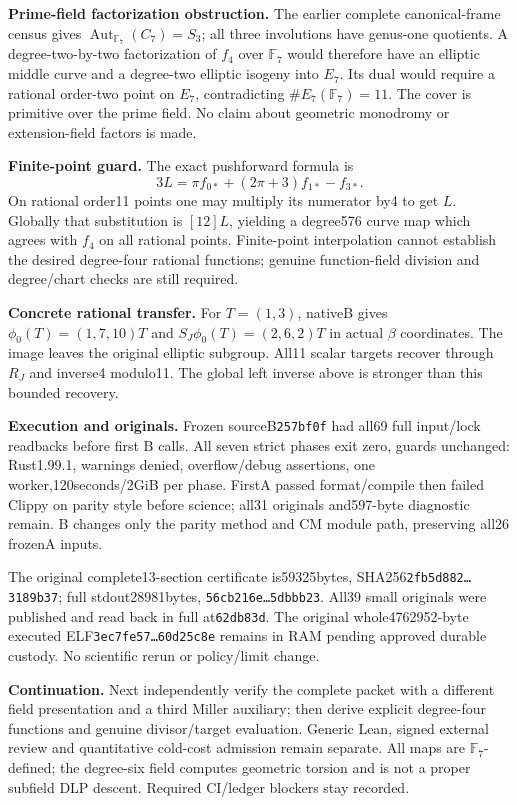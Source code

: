 \documentclass[10pt,a4paper]{article}
\begin{document}
\textbf{Prime-field factorization obstruction.} The earlier complete
canonical-frame census gives $\operatorname{Aut}_{\mathbb F_7}(C_7)=S_3$;
all three involutions have genus-one quotients. A degree-two-by-two
factorization of $f_4$ over $\mathbb F_7$ would therefore have an elliptic
middle curve and a degree-two elliptic isogeny into $E_7$. Its dual
would require a rational order-two point on $E_7$, contradicting
$\#E_7(\mathbb F_7)=11$. The cover is primitive over the prime field.
No claim about geometric monodromy or extension-field factors is made.

\textbf{Finite-point guard.} The exact pushforward formula is
\[
 3L=\pi f_{0*}+(2\pi+3)f_{1*}-f_{3*}.
\]
On rational order11 points one may multiply its numerator by4 to get
$L$. Globally that substitution is $[12]L$, yielding a degree576 curve
map which agrees with $f_4$ on all rational points. Finite-point
interpolation cannot establish the desired degree-four rational
functions; genuine function-field division and degree/chart checks
are still required.

\textbf{Concrete rational transfer.} For $T=(1,3)$, nativeB gives
$\phi_0(T)=(1,7,10)T$ and $S_J\phi_0(T)=(2,6,2)T$ in actual
$\beta$ coordinates. The image leaves the original elliptic subgroup.
All11 scalar targets recover through $R_J$ and inverse4 modulo11.
The global left inverse above is stronger than this bounded recovery.

\textbf{Execution and originals.} Frozen sourceB\texttt{257bf0f}
had all69 full input/lock readbacks before first B calls. All seven
strict phases exit zero, guards unchanged: Rust1.99.1, warnings denied,
overflow/debug assertions, one worker,120seconds/2GiB per phase.
FirstA passed format/compile then failed Clippy on parity style before
science; all31 originals and597-byte diagnostic remain. B changes only
the parity method and CM module path, preserving all26 frozenA inputs.

The original complete13-section certificate is59325bytes,
SHA256\texttt{2fb5d882\ldots{}3189b37}; full stdout28981bytes,
\texttt{56cb216e\ldots{}5dbbb23}. All39 small originals were published
and read back in full at\texttt{62db83d}. The original whole4762952-byte
executed ELF\texttt{3ec7fe57\ldots{}60d25c8e} remains in RAM pending
approved durable custody. No scientific rerun or policy/limit change.

\textbf{Continuation.} Next independently verify the complete packet
with a different field presentation and a third Miller auxiliary;
then derive explicit degree-four functions and genuine divisor/target
evaluation. Generic Lean, signed external review and quantitative
cold-cost admission remain separate. All maps are $\mathbb F_7$-defined;
the degree-six field computes geometric torsion and is not a proper
subfield DLP descent. Required CI/ledger blockers stay recorded.
\end{document}
